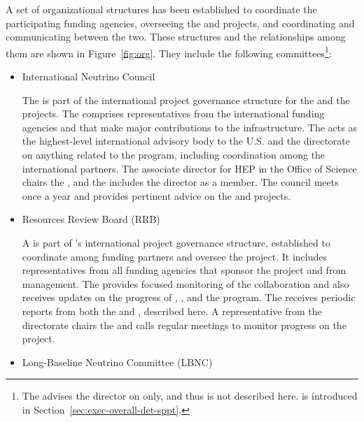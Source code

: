 A set  of  organizational structures  has been established  to
coordinate  the  participating  funding agencies,
overseeing the  and  projects,
and coordinating and communicating between the 
two. These structures and the relationships among them are shown 
in Figure~\ref{fig:org}. They include %
the following committees\footnote{The  advises the  director on  only, and thus is not described here.  is introduced in Section~\ref{sec:exec-overall-det-sppt}.}:
\begin{itemize}
\item International Neutrino Council 

The  is part of the international project governance structure for the   and the   projects. The  comprises representatives from the international funding agencies and   that make major contributions to the infrastructure. 
The  acts as the highest-level international advisory body to the U.S.   and the   directorate on anything related to the program, including coordination among the international partners. The associate director for HEP in the  Office of Science chairs the , and the  includes the   director as a member. The council meets once a year and provides pertinent advice on the  and   projects.

\item Resources Review Board (RRB)

A  is part of 's international project governance structure, 
established to coordinate among funding partners and oversee the  project. It includes representatives from all funding agencies that sponsor the project and  from  management. The   provides focused monitoring of the  collaboration and also receives updates on the progress of ,  , and the  program. The   receives periodic reports from both the  and , described here.  
A representative from the  directorate chairs the  and calls regular meetings to monitor progress on the  project.



\item Long-Baseline Neutrino Committee (LBNC)


\end{itemize}
